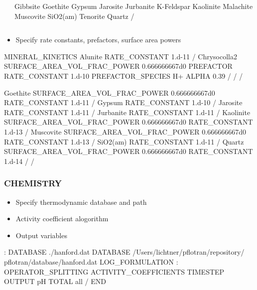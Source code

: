 \documentclass{beamer}
\begin{document}
\begin{frame}
\begin{columns}[c]
\begin{semiverbatim}
\end{semiverbatim}
\begin{semiverbatim}
    Gibbsite
    Goethite
    Gypsum
    Jarosite
    Jurbanite
    K-Feldspar
    Kaolinite
    Malachite
    Muscovite
    SiO2(am)
    Tenorite
    Quartz
  /
\end{semiverbatim}
  \end{columns}

  \newpage
  \begin{itemize}
  \item Specify rate constants, prefactors, surface area powers
  \end{itemize}
\begin{semiverbatim}
  MINERAL_KINETICS
    Alunite
      RATE_CONSTANT 1.d-11
    /
    Chrysocolla2
      SURFACE_AREA_VOL_FRAC_POWER 0.666666667d0
      PREFACTOR
        RATE_CONSTANT 1.d-10
        PREFACTOR_SPECIES H+
          ALPHA 0.39
        /
      /
    /


    Goethite
      SURFACE_AREA_VOL_FRAC_POWER 0.666666667d0
      RATE_CONSTANT 1.d-11
    /
    Gypsum
      RATE_CONSTANT 1.d-10
    /
    Jarosite
      RATE_CONSTANT 1.d-11
    /
    Jurbanite
      RATE_CONSTANT 1.d-11
    /
    Kaolinite
      SURFACE_AREA_VOL_FRAC_POWER 0.666666667d0
      RATE_CONSTANT 1.d-13
    /
    Muscovite
      SURFACE_AREA_VOL_FRAC_POWER 0.666666667d0
      RATE_CONSTANT 1.d-13
    /
    SiO2(am)
      RATE_CONSTANT 1.d-11
    /
    Quartz
      SURFACE_AREA_VOL_FRAC_POWER 0.666666667d0
      RATE_CONSTANT 1.d-14
    /
  /
\end{semiverbatim}

\end{frame}
\begin{frame}[fragile]\frametitle{\bf CHEMISTRY}

\begin{itemize}
\item Specify thermodynamic database and path
\item Activity coefficient alogorithm
\item Output variables
\end{itemize}

\begin{semiverbatim}
: DATABASE ./hanford.dat
  DATABASE /Users/lichtner/pflotran/repository/
    pflotran/database/hanford.dat
  LOG_FORMULATION
:  OPERATOR_SPLITTING
  ACTIVITY_COEFFICIENTS TIMESTEP
  OUTPUT
    pH
    TOTAL
    all
  /
END
\end{semiverbatim}
\end{frame}
\end{document}
